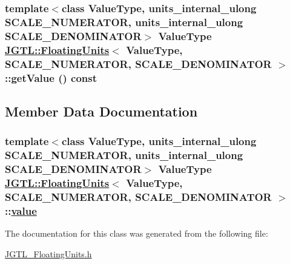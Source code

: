 \hypertarget{class_j_g_t_l_1_1_floating_units_0151027d566bdf3be45f2f8830d26664}{
\subsubsection[getValue]{\setlength{\rightskip}{0pt plus 5cm}template$<$class Value\-Type, units\_\-internal\_\-ulong SCALE\_\-NUMERATOR, units\_\-internal\_\-ulong SCALE\_\-DENOMINATOR$>$ Value\-Type \hyperlink{class_j_g_t_l_1_1_floating_units}{JGTL::Floating\-Units}$<$ Value\-Type, SCALE\_\-NUMERATOR, SCALE\_\-DENOMINATOR $>$::get\-Value () const}}
\label{class_j_g_t_l_1_1_floating_units_0151027d566bdf3be45f2f8830d26664}




\subsection{Member Data Documentation}
\hypertarget{class_j_g_t_l_1_1_floating_units_5e84b8db278f0079f543818213b2bac5}{
\subsubsection[value]{\setlength{\rightskip}{0pt plus 5cm}template$<$class Value\-Type, units\_\-internal\_\-ulong SCALE\_\-NUMERATOR, units\_\-internal\_\-ulong SCALE\_\-DENOMINATOR$>$ Value\-Type \hyperlink{class_j_g_t_l_1_1_floating_units}{JGTL::Floating\-Units}$<$ Value\-Type, SCALE\_\-NUMERATOR, SCALE\_\-DENOMINATOR $>$::\hyperlink{class_j_g_t_l_1_1_floating_units_5e84b8db278f0079f543818213b2bac5}{value}}}
\label{class_j_g_t_l_1_1_floating_units_5e84b8db278f0079f543818213b2bac5}




The documentation for this class was generated from the following file:\begin{CompactItemize}
\item 
\hyperlink{_j_g_t_l___floating_units_8h}{JGTL\_\-Floating\-Units.h}\end{CompactItemize}
